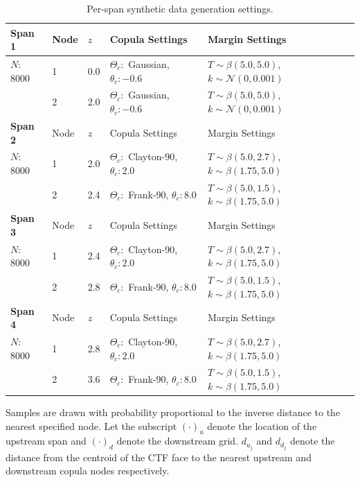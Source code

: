 \begin{table}[h]
    \begin{center}
        \caption{Per-span synthetic data generation settings.}
        \begin{tabular}{|l|l|l|l|l|}
            \hline
            \bf Span 1 & Node & $z$ & Copula Settings  & Margin Settings \\
            \hline
            $N$: 8000  & 1  & 0.0 & $\Theta_c:$ Gaussian, $\theta_c:-0.6$ &  $T\sim\beta(5.0, 5.0)$,$k\sim\mathcal{N}(0, 0.001)$ \\
                   & 2  & 2.0 & $\Theta_c:$ Gaussian, $\theta_c:-0.6$ &  $T\sim\beta(5.0, 5.0)$, $k\sim\mathcal{N}(0, 0.001)$   \\
            \hline \hline
            \bf Span 2 & Node & $z$ & Copula Settings  & Margin Settings \\
            \hline
             $N$: 8000 & 1  & 2.0 & $\Theta_c:$ Clayton-90, $\theta_c: 2.0$ &  $T\sim\beta(5.0, 2.7)$, $k\sim\beta(1.75, 5.0)$ \\
            & 2  & 2.4 & $\Theta_c:$ Frank-90, $\theta_c: 8.0$ &  $T\sim\beta(5.0, 1.5)$, $k\sim\beta(1.75, 5.0)$   \\
            \hline \hline
            \bf Span 3 & Node & $z$ & Copula Settings  & Margin Settings \\
            \hline
             $N$: 8000 & 1  & 2.4 & $\Theta_c:$ Clayton-90, $\theta_c: 2.0$ &  $T\sim\beta(5.0, 2.7)$, $k\sim\beta(1.75, 5.0)$ \\
            & 2  & 2.8 & $\Theta_c:$ Frank-90, $\theta_c: 8.0$ &  $T\sim\beta(5.0, 1.5)$, $k\sim\beta(1.75, 5.0)$   \\
            \hline \hline
            \bf Span 4 & Node & $z$ & Copula Settings  & Margin Settings \\
            \hline
            $N$: 8000 & 1  & 2.8 & $\Theta_c:$ Clayton-90, $\theta_c: 2.0$ &  $T\sim\beta(5.0, 2.7)$, $k\sim\beta(1.75, 5.0)$ \\
            & 2  & 3.6 & $\Theta_c:$ Frank-90, $\theta_c: 8.0$ &  $T\sim \beta(5.0, 1.5)$, $k\sim\beta(1.75, 5.0)$   \\
            \hline
        \end{tabular}
        \label{tab:synth_settings}
    \end{center}
\end{table}

Samples are drawn with probability proportional to the inverse distance to the nearest specified node.
Let the subscript $(\cdot)_u$ denote the location of the upstream span and $(\cdot)_d$ denote the downstream grid. $d_{u_j}$ and  $d_{d_j}$ denote the distance from the centroid of the CTF face to the nearest upstream and downstream copula nodes respectively.

